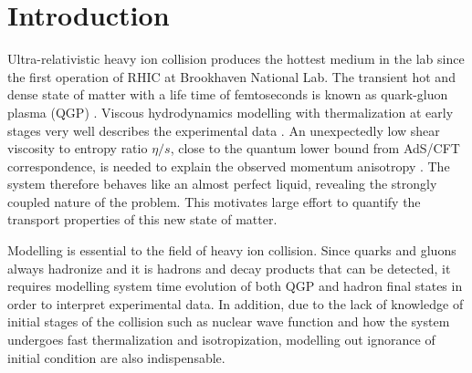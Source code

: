 \documentclass[aps,prl,twocolumn,groupedaddress]{revtex4-1}
\begin{document}
\section{Introduction}
	Ultra-relativistic heavy ion collision produces the hottest medium in the lab since the first operation of RHIC at Brookhaven National Lab. 
	The transient hot and dense state of matter with a life time of femtoseconds is known as quark-gluon plasma (QGP) \cite{Berndt:2006Review}.
	Viscous hydrodynamics modelling with thermalization at early stages very well describes the experimental data \cite{Heinz:2013Review}.
	An unexpectedly low shear viscosity to entropy ratio $\eta/s$, close to the quantum lower bound from AdS/CFT correspondence, is needed to explain the observed momentum anisotropy \cite{Huichao:2011ideal}.
	The system therefore behaves like an almost perfect liquid, revealing the strongly coupled nature of the problem.
	This motivates large effort to quantify the transport properties of this new state of matter.
	
	Modelling is essential to the field of heavy ion collision. 
	Since quarks and gluons always hadronize and it is hadrons and decay products that can be detected, it requires modelling system time evolution of both QGP and hadron final states in order to interpret experimental data. 
	In addition, due to the lack of knowledge of initial stages of the collision such as nuclear wave function and how the system undergoes fast thermalization and isotropization, modelling out ignorance of initial condition are also indispensable.
	
\end{document}
